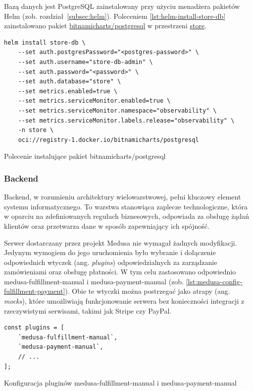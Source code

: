 \noindent Bazą danych jest PostgreSQL zainstalowany przy użyciu menadżera pakietów Helm (zob. rozdział~\ref{subsec:helm}).
Poleceniem \autoref{lst:helm-install-store-db} zainstalowano pakiet \url{bitnamicharts/postgresql} w przestrzeni \url{store}.

\begin{listing}[H]
    \begin{verbatim}
helm install store-db \
    --set auth.postgresPassword="<postgres-password>" \
    --set auth.username="store-db-admin" \
    --set auth.password="<password>" \
    --set auth.database="store" \
    --set metrics.enabled=true \
    --set metrics.serviceMonitor.enabled=true \
    --set metrics.serviceMonitor.namespace="observability" \
    --set metrics.serviceMonitor.labels.release="observability" \
    -n store \
    oci://registry-1.docker.io/bitnamicharts/postgresql
    \end{verbatim}
    \caption{Polecenie instalujące pakiet bitnamicharts/postgresql}
    \label{lst:helm-install-store-db}
\end{listing}

\subsubsection{Backend}

Backend, w rozumieniu architektury wielowarstwowej, pełni kluczowy element systemu informatycznego.
To warstwa stanowiąca zaplecze technologiczne, która w oparciu na zdefiniowanych regułach biznesowych, odpowiada za obsługę żądań klientów oraz przetwarza dane w sposób zapewniający ich spójność.

Serwer dostarczany przez projekt Medusa nie wymagał żadnych modyfikacji.
Jedynym wymogiem do jego uruchomienia było wybranie i dołączenie odpowiednich wtyczek (ang. \emph{plugins}) odpowiedzialnych za zarządzanie zamówieniami oraz obsługę płatności.
W tym celu zastosowano odpowiednio medusa-fulfillment-manual  i medusa-payment-manual (zob. \autoref{lst:medusa-config-fulfillment-payment}).
Obie te wtyczki można postrzegać jako atrapy (ang. \emph{mocks}), które umożliwiają funkcjonowanie serwera bez konieczności integracji z rzeczywistymi serwisami, takimi jak Stripe czy PayPal.

\begin{listing}[H]
    \begin{verbatim}
const plugins = [
    `medusa-fulfillment-manual`,
    `medusa-payment-manual`,
    // ...
];
    \end{verbatim}
    \caption{Konfiguracja pluginów medusa-fulfillment-manual i medusa-payment-manual}
    \label{lst:medusa-config-fulfillment-payment}
\end{listing}

